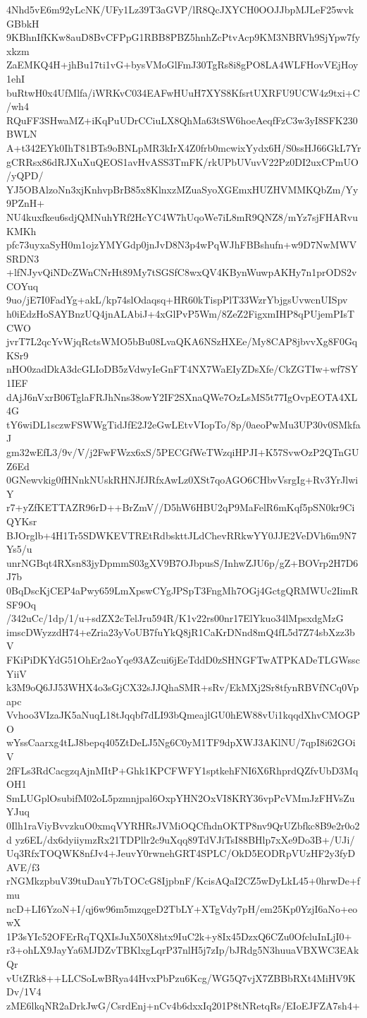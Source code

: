 4Nhd5vE6m92yLcNK/UFy1Lz39T3aGVP/lR8QcJXYCH0OOJJbpMJLeF25wvkGBbkH
9KBhnIfKKw8auD8BvCFPpG1RBB8PBZ5hnhZcPtvAcp9KM3NBRVh9SjYpw7fyxkzm
ZaEMKQ4H+jhBu17ti1vG+bysVMoGlFmJ30TgRs8i8gPO8LA4WLFHovVEjHoy1ehI
buRtwH0x4UfMlfa/iWRKvC034EAFwHUuH7XYS8KfsrtUXRFU9UCW4z9txi+C/wh4
RQuFF3SHwaMZ+iKqPuUDrCCiuLX8QhMa63tSW6hoeAeqfFzC3w3yI8SFK230BWLN
A+t342EYk0IhT81BTs9oBNLpMR3kIrX4Z0frb0mcwixYydx6H/S0ssHJ66GkL7Yr
gCRRsx86dRJXuXuQEOS1avHvASS3TmFK/rkUPbUVuvV22Pz0DI2uxCPmUO/yQPD/
YJ5OBAlzoNn3xjKnhvpBrB85x8KlnxzMZuaSyoXGEmxHUZHVMMKQbZm/Yy9PZnH+
NU4kuxfkeu6sdjQMNuhYRf2HcYC4W7hUqoWe7iL8mR9QNZ8/mYz7sjFHARvuKMKh
pfc73uyxaSyH0m1ojzYMYGdp0jnJvD8N3p4wPqWJhFBBshufn+w9D7NwMWVSRDN3
+lfNJyvQiNDcZWnCNrHt89My7tSGSfC8wxQV4KBynWuwpAKHy7n1prODS2vCOYuq
9uo/jE7I0FadYg+akL/kp74slOdaqsq+HR60kTispPlT33WzrYbjgsUvwcnUISpv
h0iEdzHoSAYBnzUQ4jnALAbiJ+4xGlPvP5Wm/8ZeZ2FigxmIHP8qPUjemPIsTCWO
jvrT7L2qcYvWjqRctsWMO5bBu08LvaQKA6NSzHXEe/My8CAP8jbvvXg8F0GqKSr9
nHO0zadDkA3dcGLIoDB5zVdwyIeGnFT4NX7WaEIyZDsXfe/CkZGTIw+wf7SY1IEF
dAjJ6nVxrB06TglaFRJhNns38owY2IF2SXnaQWe7OzLsMS5t77IgOvpEOTA4XL4G
tY6wiDL1sczwFSWWgTidJfE2J2eGwLEtvVIopTo/8p/0aeoPwMu3UP30v0SMkfaJ
gm32wEfL3/9v/V/j2FwFWzx6xS/5PECGfWeTWzqiHPJI+K57SvwOzP2QTnGUZ6Ed
0GNewvkig0fHNnkNUskRHNJfJRfxAwLz0XSt7qoAGO6CHbvVsrgIg+Rv3YrJlwiY
r7+yZfKETTAZR96rD++BrZmV//D5hW6HBU2qP9MaFelR6mKqf5pSN0kr9CiQYKsr
BJOrglb+4H1Tr5SDWKEVTREtRdbskttJLdChevRRkwYY0JJE2VeDVh6m9N7Ys5/u
unrNGBqt4RXsn83jyDpmmS03gXV9B7OJbpusS/InhwZJU6p/gZ+BOVrp2H7D6J7b
0BqDscKjCEP4aPwy659LmXpswCYgJPSpT3FngMh7OGj4GctgQRMWUc2IimRSF9Oq
/342uCc/1dp/1/u+sdZX2cTelJru594R/K1v22rs00nr17ElYkuo34lMpsxdgMzG
imscDWyzzdH74+eZria23yVoUB7fuYkQ8jR1CaKrDNnd8mQ4fL5d7Z74sbXzz3bV
FKiPiDKYdG51OhEr2aoYqe93AZcui6jEeTddD0zSHNGFTwATPKADeTLGWsscYiiV
k3M9oQ6JJ53WHX4o3sGjCX32sJJQhaSMR+sRv/EkMXj2Sr8tfynRBVfNCq0Vpapc
Vvhoo3VIzaJK5aNuqL18tJqqbf7dLI93bQmeajlGU0hEW88vUi1kqqdXhvCMOGPO
wYssCaarxg4tLJ8bepq405ZtDeLJ5Ng6C0yM1TF9dpXWJ3AKlNU/7qpI8i62GOiV
2fFLs3RdCacgzqAjnMItP+Ghk1KPCFWFY1sptkehFNI6X6RhprdQZfvUbD3MqOH1
SmLUGplOsubifM02oL5pzmnjpal6OxpYHN2OxVI8KRY36vpPcVMmJzFHVsZuYJuq
0Ilh1raViyBvvzkuO0xmqVYRHRsJVMiOQCfhdnOKTP8nv9QrUZbfkc8B9e2r0o2d
yz6EL/dx6dyiiymzRx21TDPllr2c9uXqq89TdVJiTsI88BHlp7xXe9Do3B+/UJi/
Uq3RfxTOQWK8nfJv4+JeuvY0rwnehGRT4SPLC/OkD5EODRpVUzHF2y3fyDAVE/f3
rNGMkzpbuV39tuDauY7bTOCcG8IjpbnF/KcisAQaI2CZ5wDyLkL45+0hrwDe+fmu
ncD+LI6YzoN+I/qj6w96m5mzqgeD2TbLY+XTgVdy7pH/em25Kp0YzjI6aNo+eowX
1P3sYIc52OFErRqTQXIsJuX50X8htx9IuC2k+y8Ix45DzxQ6CZu0OfcluInLjI0+
r3+ohLX9JayYa6MJDZvTBKlxgLqrP37nlH5j7zIp/bJRdg5N3huuaVBXWC3EAkQr
vUtZRk8++LLCSoLwBRya44HvxPbPzu6Kcg/WG5Q7vjX7ZBBbRXt4MiHV9KDv/1V4
zME6lkqNR2aDrkJwG/CsrdEnj+nCv4b6dxxIq201P8tNRetqRs/EIoEJFZA7sh4+
